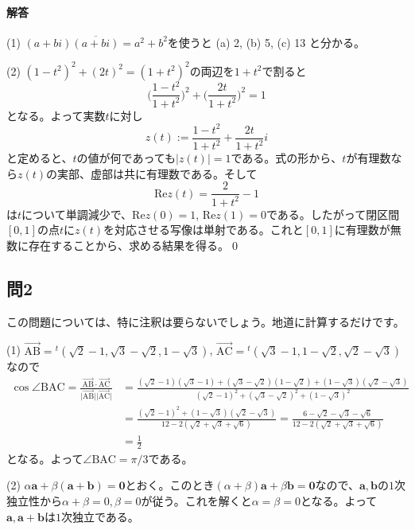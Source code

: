 \paragraph{解答}
\noindent (1) $(a + bi)\overline{(a + bi)} = a^2 + b^2$を使うと (a) 2, (b) 5, (c) 13 と分かる。

\noindent (2) $(1 - t^2)^2 + (2t)^2 = (1 + t^2)^2$の両辺を$1 + t^2$で割ると
\[
\biggl(\frac{1 - t^2}{1 + t^2}\biggr)^2 + \biggl(\frac{2t}{1 + t^2}\biggr)^2 = 1
\]
となる。よって実数$t$に対し
\[
z(t) := \frac{1 - t^2}{1 + t^2} + \frac{2t}{1 + t^2}i
\]
と定めると、$t$の値が何であっても$|z(t)| = 1$である。式の形から、$t$が有理数なら$z(t)$の実部、虚部は共に有理数である。そして
\[
\mathrm{Re} z(t) = \frac{2}{1 + t^2} - 1
\]
は$t$について単調減少で、$\mathrm{Re} z(0) = 1$, $\mathrm{Re} z(1) = 0$である。したがって閉区間$[0, 1]$の点$t$に$z(t)$を対応させる写像は単射である。これと$[0, 1]$に有理数が無数に存在することから、求める結果を得る。\qed

\subsection{問2}

この問題については、特に注釈は要らないでしょう。地道に計算するだけです。

\noindent (1) 
$\overrightarrow{\mathrm{AB}} = {}^t(\sqrt{2} - 1 ,\sqrt{3} - \sqrt{2} ,1 - \sqrt{3})$, $\overrightarrow{\mathrm{AC}} = {}^t(\sqrt{3} - 1, 1 - \sqrt{2}, \sqrt{2} - \sqrt{3})$なので
\begin{align*}
\cos\angle\mathrm{BAC} = \frac{\overrightarrow{\mathrm{AB}}\cdot \overrightarrow{\mathrm{AC}}}{\bigl|\overrightarrow{\mathrm{AB}}\bigr|\bigl|\overrightarrow{\mathrm{AC}}\bigr|}
&= \frac{(\sqrt{2} - 1)(\sqrt{3} - 1) + (\sqrt{3} - \sqrt{2})(1 - \sqrt{2}) + (1 - \sqrt{3})(\sqrt{2} - \sqrt{3})}{(\sqrt{2} - 1)^2 + (\sqrt{3} - \sqrt{2})^2 + (1 - \sqrt{3})^2} \\
&= \frac{(\sqrt{2} - 1)^2 + (1 - \sqrt{3})(\sqrt{2} - \sqrt{3})}{12 - 2(\sqrt{2} + \sqrt{3} + \sqrt{6})}
= \frac{6 - \sqrt{2} - \sqrt{3} - \sqrt{6}}{12 - 2(\sqrt{2} + \sqrt{3} + \sqrt{6})} \\
&= \frac{1}{2}
\end{align*}
となる。よって$\angle\mathrm{BAC} = \pi/3$である。

\noindent (2) $\alpha \bm{a} + \beta (\bm{a} + \bm{b}) = \bm{0}$とおく。このとき$(\alpha + \beta)\bm{a} + \beta \bm{b} = \bm{0}$なので、$\bm{a}, \bm{b}$の$1$次独立性から$\alpha + \beta = 0, \beta = 0$が従う。これを解くと$\alpha = \beta = 0$となる。よって$\bm{a}, \bm{a} + \bm{b}$は$1$次独立である。

